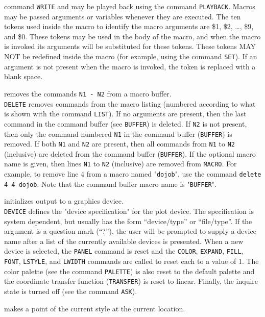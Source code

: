 	command {\tt WRITE} and may be played
	back using the command {\tt PLAYBACK}.
	Macros may be passed arguments or variables whenever they are
	executed.  The ten tokens used inside the macro to identify the
	macro arguments are \$1, \$2, \dots, \$9, and \$0.  These tokens may be
	used in the body of the macro, and when the macro is invoked its
	arguments will be substituted for these tokens.  These tokens MAY
	NOT be redefined inside the macro (for example, using the command
	{\tt SET}).  If an argument is not present when the macro
	is invoked, the token is replaced with a blank space.
\item [{\tt DELETE [N1 [N2 [MACRO]]] } --] removes the commands {\tt N1 - N2} from a macro buffer.\\
	{\tt DELETE} removes commands from the macro listing
	(numbered according to what is shown with the command
	{\tt LIST}).  If no arguments are present,
	then the last command in the command buffer (see
	{\tt BUFFER}) is deleted.  If
	{\tt N2} is not present, then only the command numbered
	{\tt N1} in the command buffer
	({\tt BUFFER}) is removed.  If both
	{\tt N1} and {\tt N2} are present, then all commands
	from {\tt N1} to {\tt N2} (inclusive) are deleted
	from the command buffer ({\tt BUFFER}).
	If the optional macro name is given, then lines {\tt N1} to
	{\tt N2} (inclusive) are removed from {\tt MACRO}.
	For example, to remove line 4 from a macro named "{\tt dojob}",
	use the command {\tt delete 4 4 dojob}.
	Note that the command buffer macro name is "{\tt BUFFER}".
\item [{\tt DEVICE device } --] initializes output to a graphics device.\\
	{\tt DEVICE} defines the "device specification" for the
	plot device.  The specification is system dependent, but usually
	has the form ``device/type'' or ``file/type''.  If the argument is a
	question mark (``?''), the user will be prompted to supply a device
	name after a list of the currently available devices is
	presented.  When a new device is selected, the
	{\tt PANEL} command is reset and the
	{\tt COLOR},
	{\tt EXPAND},
	{\tt FILL},
	{\tt FONT},
	{\tt LSTYLE}, and
	{\tt LWIDTH} commands are called to reset
	each to a value of 1.  The color palette (see the command
	{\tt PALETTE}) is also reset to
	the default palette and the coordinate transfer function
	({\tt TRANSFER}) is reset to linear.
	Finally, the inquire state is turned off (see the command
	{\tt ASK}).
\item [{\tt DOT [X Y] } --] makes a point of the current style at the current location.\\
